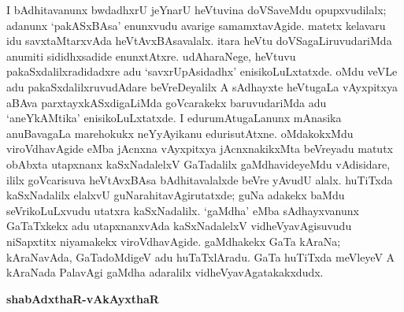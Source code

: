 I bAdhitavanunx bwdadhxrU jeYnarU heVtuvina doVSaveMdu opupxvudilalx; adanunx `pakASxBAsa' enunxvudu avarige samamxtavAgide. matetx kelavaru idu savxtaMtarxvAda heVtAvxBAsavalalx. itara heVtu doVSagaLiruvudariMda anumiti sididhxsadide enunxtAtxre. udAharaNege, heVtuvu pakaSxdalilxradidadxre adu `savxrUpAsidadhx' enisikoLuLxtatxde. oMdu veVLe adu pakaSxdalilxruvudAdare beVreDeyalilx A sAdhayxte heVtugaLa vAyxpitxya aBAva parxtayxkASxdigaLiMda goVcarakekx baruvudariMda adu `aneYkAMtika' enisikoLuLxtatxde. I edurumAtugaLanunx mAnasika anuBavagaLa marehokukx neYyAyikanu edurisutAtxne. oMdakokxMdu viroVdhavAgide eMba jAcnxna vAyxpitxya jAcnxnakikxMta beVreyadu matutx obAbxta utapxnanx kaSxNadalelxV GaTadalilx gaMdhavideyeMdu vAdisidare, ililx goVcarisuva heVtAvxBAsa bAdhitavalalxde beVre yAvudU alalx. huTiTxda kaSxNadalilx elalxvU guNarahitavAgirutatxde; guNa adakekx baMdu seVrikoLuLxvudu utatxra kaSxNadalilx. `gaMdha' eMba sAdhayxvanunx GaTaTxkekx adu utapxnanxvAda kaSxNadalelxV vidheVyavAgisuvudu niSapxtitx niyamakekx viroVdhavAgide. gaMdhakekx GaTa kAraNa; kAraNavAda, GaTadoMdigeV adu huTaTxlAradu. GaTa huTiTxda meVleyeV A kAraNada PalavAgi gaMdha adaralilx vidheVyavAgatakakxdudx.

\bigskip
\begin{center}
{\Large\bf shabAdxthaR-vAkAyxthaR}
\end{center}

